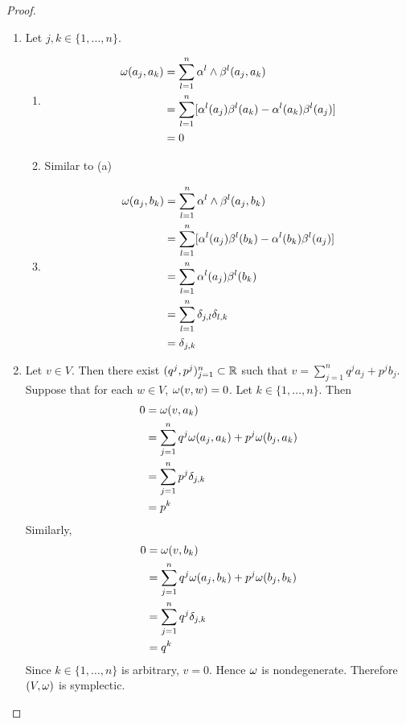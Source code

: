 \documentclass{book}
\begin{document}
	\begin{proof}\
		\begin{enumerate}
			\item Let $j,k \in \{1, \ldots, n\}$.
			\begin{enumerate}
				\item \begin{align*}
					\omega(a_j, a_k)
					& = \sum_{l=1}^n \alpha^l \wedge \beta^l (a_j, a_k) \\
					& = \sum_{l=1}^n [\alpha^l(a_j) \beta^l (a_k) - \alpha^l(a_k) \beta^l(a_j)] \\
					& = 0 
				\end{align*}
				\item Similar to (a)
				\item 
				\begin{align*}
					\omega(a_j, b_k)
					& = \sum_{l=1}^n \alpha^l \wedge \beta^l (a_j, b_k) \\
					& = \sum_{l=1}^n [\alpha^l(a_j) \beta^l (b_k) - \alpha^l(b_k) \beta^l(a_j)] \\
					& = \sum_{l=1}^n \alpha^l(a_j) \beta^l (b_k) \\
					& = \sum_{l=1}^n \delta_{j,l} \delta_{l,k} \\
					& = \delta_{j,k}
				\end{align*}
			\end{enumerate}
			\item Let $v \in V$. Then there exist $(q^j, p^j)_{j=1}^n \subset \mathbb{R}$ such that $v = \sum\limits_{j=1}^n q^j a_j + p^j b_j$. Suppose that for each $w \in V$, $\omega(v, w) = 0$. Let $k \in \{1, \ldots, n\}$. Then 
			\begin{align*}
				0
				& = \omega(v, a_k) \\
				& = \sum_{j=1}^n q^j \omega(a_j, a_k) + p^j \omega(b_j, a_k) \\
				& = \sum_{j=1}^n p^j \delta_{j,k} \\
				& = p^k
			\end{align*}
			Similarly, 
			\begin{align*}
				0
				& = \omega(v, b_k) \\
				& = \sum_{j=1}^n q^j \omega(a_j, b_k) + p^j \omega(b_j, b_k) \\
				& = \sum_{j=1}^n q^j \delta_{j,k} \\
				& = q^k
			\end{align*}
			Since $k \in \{1, \ldots, n\}$ is arbitrary, $v = 0$. Hence $\omega$ is nondegenerate. Therefore $(V, \omega)$ is symplectic.  
		\end{enumerate}
	\end{proof}
	
\end{document}
